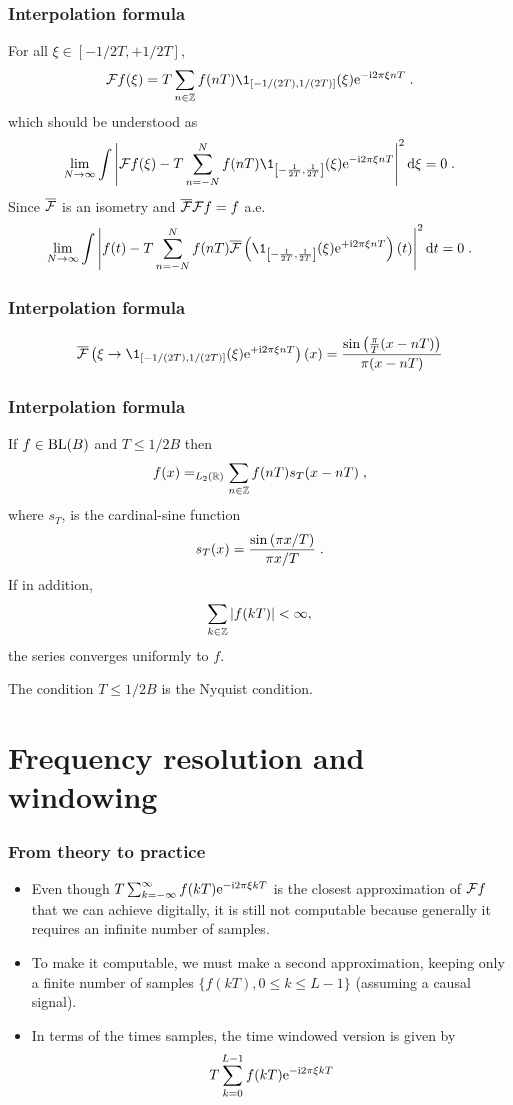 \begin{frame}
\frametitle{Interpolation formula}
For all $\xi \in [-1/2T,+1/2T]$,
$$
\TF f (\xi) = T \sum_{n \in \zset} f(nT) \1_{[-1/(2T),1/(2T)]}(\xi) \rme^{- \rmi 2 \pi \xi n T} \eqsp.
$$
which should be understood as
$$
\lim_{N \to \infty} \int \left| \TF f(\xi)  - T \sum_{n =-N}^N f(nT) \1_{\left[-\frac{1}{2T},\frac{1}{2T}\right]}(\xi) \rme^{- \rmi 2 \pi
    \xi n T}  \right|^2 \rmd \xi = 0 \eqsp.
$$
Since $\overline{\mathcal{F}}$ is an isometry and $\overline{\mathcal{F}} \mathcal{F} f = f$ a.e.
$$
\lim_{N \to \infty} \int \left| f(t)  - T \sum_{n =-N}^N f(nT) \TFAC{\1_{\left[-\frac{1}{2T},\frac{1}{2T}\right]}(\xi) \rme^{+ \rmi 2 \pi
    \xi n T}}(t) \right|^2 \rmd t = 0 \eqsp.
$$
\end{frame}

\begin{frame}
\frametitle{Interpolation formula}
\begin{lemma}
$$
\TFAC{\xi \to \1_{[-1/(2T),1/(2T)]}(\xi) \rme^{+ \rmi 2 \pi \xi n T}}(x)= \frac{\sin\left( \frac{\pi}{T}(x - nT)\right)}{\pi(x-nT)}
$$
\end{lemma}


\end{frame}

\begin{frame}
\frametitle{Interpolation formula}
\begin{theorem}
If $f \in \mathrm{BL}(B)$ and $T \leq 1/2B$ then
\alert{
\begin{equation*}
f(x) =_{L_2(\mathbb{R})} \sum_{n \in \mathbb{Z}} f(nT) s_T(x-nT)  \;,
\end{equation*}
}
where $s_T$, is the cardinal-sine function
\alert{
$$
s_T(x) = \frac{\sin \left( \pi x/T\right) }{ \pi x/T}\;.
$$
}
If in addition,
$$
\sum_{k \in \mathbb{Z}} |f(kT)| < \infty,
$$
the series converges uniformly to $f$.
\end{theorem}
The condition  \alert{$T \leq 1/2B$} is the \alert{Nyquist condition}.
\end{frame}

\section{Frequency resolution and windowing}

\begin{frame}
\frametitle{From theory to practice}
\begin{itemize}
\item Even though $T\sum_{k=-\infty}^{\infty} f(kT) \mathrm{e}^{-\mathrm{i} 2 \pi \xi kT}$ is the closest approximation  of $\mathcal{F} f$ that we can achieve digitally, it is still not computable because generally it requires an \alert{infinite number of samples}.
\item To make it computable, we must make a \alert{second approximation}, keeping only a \alert{finite number} of samples $\{ f(kT), 0\leq k \leq L-1\}$ (assuming a \alert{causal} signal).
\item In terms of the times samples, the \alert{time windowed version} is given by
\[
T \sum_{k=0}^{L-1} f(kT) \mathrm{e}^{- \mathrm{i} 2 \pi \xi kT}  
\]
\end{itemize}
\end{frame}

